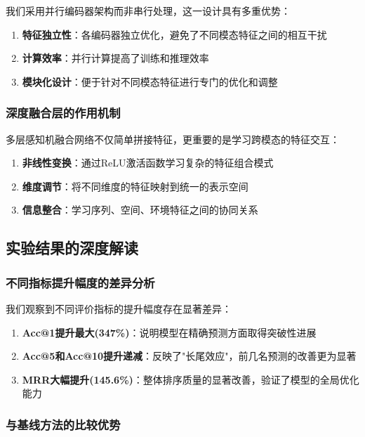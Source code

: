 \documentclass{article}
\begin{document}
我们采用并行编码器架构而非串行处理，这一设计具有多重优势：

\begin{enumerate}
\item \textbf{特征独立性}：各编码器独立优化，避免了不同模态特征之间的相互干扰
\item \textbf{计算效率}：并行计算提高了训练和推理效率
\item \textbf{模块化设计}：便于针对不同模态特征进行专门的优化和调整
\end{enumerate}

\subsubsection{深度融合层的作用机制}

多层感知机融合网络不仅简单拼接特征，更重要的是学习跨模态的特征交互：

\begin{enumerate}
\item \textbf{非线性变换}：通过ReLU激活函数学习复杂的特征组合模式
\item \textbf{维度调节}：将不同维度的特征映射到统一的表示空间
\item \textbf{信息整合}：学习序列、空间、环境特征之间的协同关系
\end{enumerate}

\subsection{实验结果的深度解读}

\subsubsection{不同指标提升幅度的差异分析}

我们观察到不同评价指标的提升幅度存在显著差异：

\begin{enumerate}
\item \textbf{Acc@1提升最大(347\%)}：说明模型在精确预测方面取得突破性进展
\item \textbf{Acc@5和Acc@10提升递减}：反映了"长尾效应"，前几名预测的改善更为显著
\item \textbf{MRR大幅提升(145.6\%)}：整体排序质量的显著改善，验证了模型的全局优化能力
\end{enumerate}

\subsubsection{与基线方法的比较优势}
\end{document}
